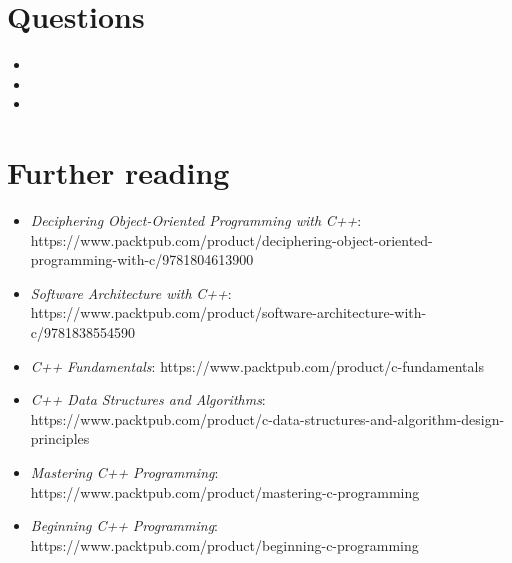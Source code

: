 
\section{Questions}

\begin{itemize}
\item
\item
\item
\end{itemize}

\section{Further reading}

\begin{itemize}
\item
  \emph{Deciphering Object-Oriented Programming with} \emph{C++}: https://www.packtpub.com/product/deciphering-object-oriented-programming-with-c/9781804613900
\item
  \emph{Software Architecture with} \emph{C++}: https://www.packtpub.com/product/software-architecture-with-c/9781838554590
\item
  \emph{C++} \emph{Fundamentals}: https://www.packtpub.com/product/c-fundamentals
\item
  \emph{C++ Data Structures and} \emph{Algorithms}: https://www.packtpub.com/product/c-data-structures-and-algorithm-design-principles
\item
  \emph{Mastering C++} \emph{Programming}: https://www.packtpub.com/product/mastering-c-programming
\item
  \emph{Beginning C++} \emph{Programming}: https://www.packtpub.com/product/beginning-c-programming
\end{itemize}

